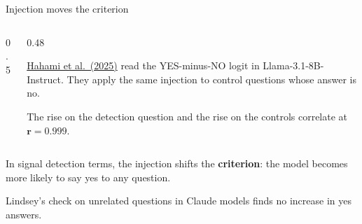\documentclass[aspectratio=169,11pt]{beamer}
\newcommand{\site}{https://measuring-introspection.github.io/measuring-introspection}
\begin{document}
\begin{frame}[label=hahami]{Injection moves the criterion}
\begin{columns}[T]
\begin{column}{0.5\textwidth}
\end{column}
\begin{column}{0.48\textwidth}
{\small \href{\site/papers/hahami-2025/}{Hahami et al.\ (2025)} read the YES-minus-NO logit in Llama-3.1-8B-Instruct. They apply the same injection to control questions whose answer is no.

\vspace{0.4em}
The rise on the detection question and the rise on the controls correlate at $\mathbf{r = 0.999}$.}
\end{column}
\end{columns}

\vspace{0.5em}
In signal detection terms, the injection shifts the \textbf{\textcolor{bias}{criterion}}: the model becomes more likely to say yes to any question.

\vspace{0.3em}
{\small Lindsey's check on unrelated questions in Claude models finds no increase in yes answers.}
\end{frame}
\end{document}

